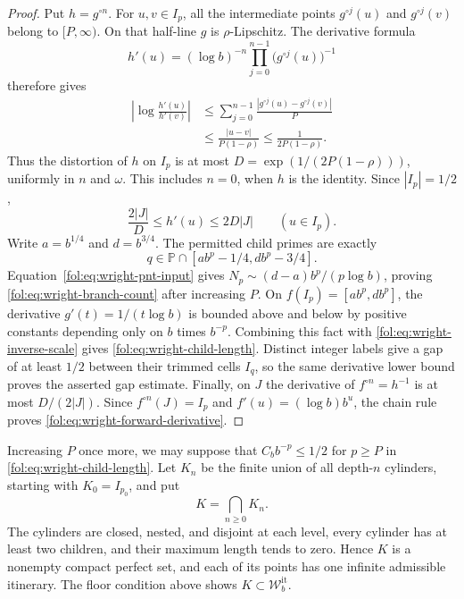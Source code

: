 \documentclass[11pt,a4paper]{article}
\theoremstyle{definition}
\theoremstyle{remark}
\numberwithin{equation}{section}
\begin{document}
\begin{proof}
Put $h=g^{\circ n}$. For $u,v\in I_p$, all the intermediate points
$g^{\circ j}(u)$ and $g^{\circ j}(v)$ belong to $[P,\infty)$.
On that half-line $g$ is $\rho$-Lipschitz. The derivative formula
\[
 h'(u)=(\log b)^{-n}
       \prod_{j=0}^{n-1}\bigl(g^{\circ j}(u)\bigr)^{-1}
\]
therefore gives
\begin{align*}
 \left|\log\frac{h'(u)}{h'(v)}\right|
 &\le\sum_{j=0}^{n-1}
       \frac{|g^{\circ j}(u)-g^{\circ j}(v)|}{P}\\
 &\le\frac{|u-v|}{P(1-\rho)}
 \le\frac1{2P(1-\rho)}.
\end{align*}
Thus the distortion of $h$ on $I_p$ is at most
$D=\exp(1/(2P(1-\rho)))$, uniformly in $n$ and $\omega$.
This includes $n=0$, when $h$ is the identity. Since $|I_p|=1/2$,
\begin{equation}\label{fol:eq:wright-inverse-scale}
 \frac{2|J|}{D}\le h'(u)\le2D|J|
 \qquad(u\in I_p).
\end{equation}
Write $a=b^{1/4}$ and $d=b^{3/4}$. The permitted child primes are exactly
\[
 q\in\mathbb P\cap[ab^p-1/4,db^p-3/4].
\]
Equation~\eqref{fol:eq:wright-pnt-input} gives
$N_p\sim(d-a)b^p/(p\log b)$, proving
\eqref{fol:eq:wright-branch-count} after increasing $P$.
On $f(I_p)=[ab^p,db^p]$, the derivative
$g'(t)=1/(t\log b)$ is bounded above and below by positive constants
depending only on $b$ times $b^{-p}$. Combining this fact with
\eqref{fol:eq:wright-inverse-scale} gives
\eqref{fol:eq:wright-child-length}. Distinct integer labels give a gap
of at least $1/2$ between their trimmed cells $I_q$, so the same derivative lower bound proves the asserted gap estimate.
Finally, on $J$ the derivative of $f^{\circ n}=h^{-1}$ is at most
$D/(2|J|)$. Since $f^{\circ n}(J)=I_p$ and
$f'(u)=(\log b)b^u$, the chain rule proves
\eqref{fol:eq:wright-forward-derivative}.
\end{proof}
Increasing $P$ once more, we may suppose that
$C_b b^{-p}\le1/2$ for $p\ge P$ in
\eqref{fol:eq:wright-child-length}. Let $K_n$ be the finite union of all
depth-$n$ cylinders, starting with $K_0=I_{p_0}$, and put
\[
 K=\bigcap_{n\ge0}K_n.
\]
The cylinders are closed, nested, and disjoint at each level, every cylinder has at least two children, and their maximum length tends to
zero. Hence $K$ is a nonempty compact perfect set, and each of its points has one infinite admissible itinerary. The floor condition
above shows $K\subset\mathcal W_b^{\mathrm{it}}$.
\end{document}
